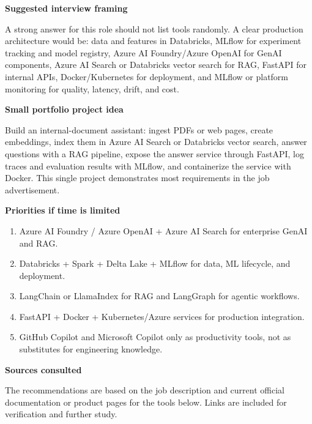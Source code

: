 \documentclass[11pt,a4paper]{article}
\newcommand{\sectiontitle}[1]{%
    \vspace{0.35em}
    {\Large\bfseries\color{navy}#1}\par
    \vspace{0.25em}
}
\begin{document}
    \newpage
    
    \sectiontitle{Suggested interview framing}
    
    A strong answer for this role should not list tools randomly. A clear production
    architecture would be: data and features in Databricks, MLflow for experiment
    tracking and model registry, Azure AI Foundry/Azure OpenAI for GenAI components,
    Azure AI Search or Databricks vector search for RAG, FastAPI for internal APIs,
    Docker/Kubernetes for deployment, and MLflow or platform monitoring for quality,
    latency, drift, and cost.
    
    \sectiontitle{Small portfolio project idea}
    
    Build an internal-document assistant: ingest PDFs or web pages, create embeddings,
    index them in Azure AI Search or Databricks vector search, answer questions with a
    RAG pipeline, expose the answer service through FastAPI, log traces and evaluation
    results with MLflow, and containerize the service with Docker. This single project
    demonstrates most requirements in the job advertisement.
    
    \sectiontitle{Priorities if time is limited}
    
    \begin{enumerate}
        \item Azure AI Foundry / Azure OpenAI + Azure AI Search for enterprise GenAI and RAG.
        \item Databricks + Spark + Delta Lake + MLflow for data, ML lifecycle, and deployment.
        \item LangChain or LlamaIndex for RAG and LangGraph for agentic workflows.
        \item FastAPI + Docker + Kubernetes/Azure services for production integration.
        \item GitHub Copilot and Microsoft Copilot only as productivity tools, not as substitutes for engineering knowledge.
    \end{enumerate}
    
    \sectiontitle{Sources consulted}
    
    The recommendations are based on the job description and current official
    documentation or product pages for the tools below. Links are included for
    verification and further study.
    
\end{document}
